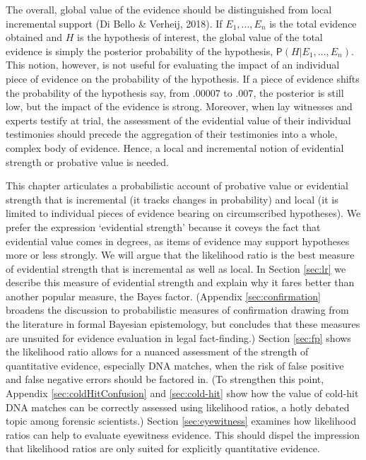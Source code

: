 \documentclass[
  10pt,
  dvipsnames,enabledeprecatedfontcommands]{scrartcl}
\newcommand{\pr}[1]{\mathsf{P}(#1)}
\begin{document}
The overall, global value of the evidence should be distinguished from
local incremental support (Di Bello \& Verheij, 2018). If
\(E_1, \dots, E_n\) is the total evidence obtained and \(H\) is the
hypothesis of interest, the global value of the total evidence is simply
the posterior probability of the hypothesis,
\(\pr{H \vert E_1, \dots, E_n}\). This notion, however, is not useful
for evaluating the impact of an individual piece of evidence on the
probability of the hypothesis. If a piece of evidence shifts the
probability of the hypothesis say, from \(.00007\) to \(.007\), the
posterior is still low, but the impact of the evidence is strong.
Moreover, when lay witnesses and experts testify at trial, the
assessment of the evidential value of their individual testimonies
should precede the aggregation of their testimonies into a whole,
complex body of evidence. Hence, a local and incremental notion of
evidential strength or probative value is needed.

This chapter articulates a probabilistic account of probative value or
evidential strength that is incremental (it tracks changes in
probability) and local (it is limited to individual pieces of evidence
bearing on circumscribed hypotheses). We prefer the expression
`evidential strength' because it coveys the fact that evidential value
comes in degrees, as items of evidence may support hypotheses more or
less strongly. We will argue that the likelihood ratio is the best
measure of evidential strength that is incremental as well as local. In
Section \ref{sec:lr} we describe this measure of evidential strength and
explain why it fares better than another popular measure, the Bayes
factor. (Appendix \ref{sec:confirmation} broadens the discussion to
probabilistic measures of confirmation drawing from the literature in
formal Bayesian epistemology, but concludes that these measures are
unsuited for evidence evaluation in legal fact-finding.) Section
\ref{sec:fp} shows the likelihood ratio allows for a nuanced assessment
of the strength of quantitative evidence, especially DNA matches, when
the risk of false positive and false negative errors should be factored
in. (To strengthen this point, Appendix \ref{sec:coldHitConfusion} and
\ref{sec:cold-hit} show how the value of cold-hit DNA matches can be
correctly assessed using likelihood ratios, a hotly debated topic among
forensic scientists.) Section \ref{sec:eyewitness} examines how
likelihood ratios can help to evaluate eyewitness evidence. This should
dispel the impression that likelihood ratios are only suited for
explicitly quantitative evidence.
\end{document}

